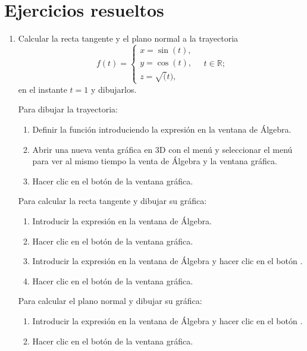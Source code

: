 \newpage

\section{Ejercicios resueltos}
\begin{enumerate}[leftmargin=*]
\item Calcular la recta tangente y el plano normal a la trayectoria
\[
f(t)=
\begin{cases}
x=\sin(t),\\
y=\cos(t),\\
z=\sqrt(t),
\end{cases}
\quad t\in \mathbb{R};
\] 
en el instante $t=1$ y dibujarlos.
  
\begin{indication}
Para dibujar la trayectoria:
\begin{enumerate}
\item Definir la función introduciendo la expresión  en la ventana de Álgebra.
\item Abrir una nueva venta gráfica en 3D con el menú  y seleccionar el menú  para ver al mismo tiempo la venta de Álgebra y la ventana gráfica.
\item Hacer clic en el botón  de la ventana gráfica.
\end{enumerate}
Para calcular la recta tangente y dibujar su gráfica:
\begin{enumerate}
\item Introducir la expresión  en la ventana de Álgebra.
\item Hacer clic en el botón  de la ventana gráfica.
\item Introducir la expresión  en la ventana de Álgebra y hacer clic en el botón .
\item Hacer clic en el botón  de la ventana gráfica.
\end{enumerate}
Para calcular el plano normal y dibujar su gráfica:
\begin{enumerate}
\item Introducir la expresión  en la ventana de Álgebra y hacer clic en el botón .
\item Hacer clic en el botón  de la ventana gráfica.
\end{enumerate}
\end{indication}    
  

\end{enumerate}
